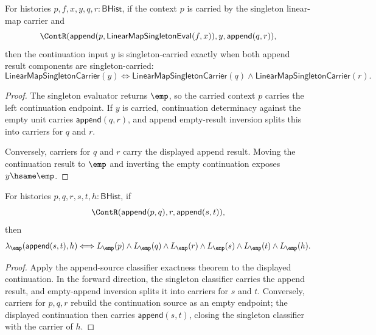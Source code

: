 \begin{theorem}
\label{thm:linearmap-singleton-eval-context-continuation-append-result-carrier-iff}
For histories $p,f,x,y,q,r:\mathsf{BHist}$, if the context $p$ is carried by
the singleton linear-map carrier and
$$
\ContR(\mathsf{append}(p,\mathsf{LinearMapSingletonEval}(f,x)),y,
  \mathsf{append}(q,r)),
$$
then the continuation input $y$ is singleton-carried exactly when both append
result components are singleton-carried:
$$
\mathsf{LinearMapSingletonCarrier}(y)
\Longleftrightarrow
\mathsf{LinearMapSingletonCarrier}(q)\land
\mathsf{LinearMapSingletonCarrier}(r).
$$
\end{theorem}
\begin{proof}
The singleton evaluator returns $\emp$, so the carried context $p$ carries the
left continuation endpoint. If $y$ is carried, continuation determinacy against
the empty unit carries $\mathsf{append}(q,r)$, and append empty-result
inversion splits this into carriers for $q$ and $r$.

Conversely, carriers for $q$ and $r$ carry the displayed append result. Moving
the continuation result to $\emp$ and inverting the empty continuation exposes
$y\hsame\emp$.
\end{proof}

\begin{theorem}
\label{thm:linearmap-singleton-classifier-continuation-append-source-append-result-iff}
For histories \(p,q,r,s,t,h:\mathsf{BHist}\), if
$$
\ContR(\mathsf{append}(p,q),r,\mathsf{append}(s,t)),
$$
then
$$
\lambda_{\emp}(\mathsf{append}(s,t),h)
\Longleftrightarrow
L_{\emp}(p)\wedge L_{\emp}(q)\wedge L_{\emp}(r)\wedge
L_{\emp}(s)\wedge L_{\emp}(t)\wedge L_{\emp}(h).
$$
\end{theorem}
\begin{proof}
Apply the append-source classifier exactness theorem to the displayed
continuation. In the forward direction, the singleton classifier carries the
append result, and empty-append inversion splits it into carriers for \(s\) and
\(t\). Conversely, carriers for \(p,q,r\) rebuild the continuation source as
an empty endpoint; the displayed continuation then carries
\(\mathsf{append}(s,t)\), closing the singleton classifier with the carrier of
\(h\).
\end{proof}
